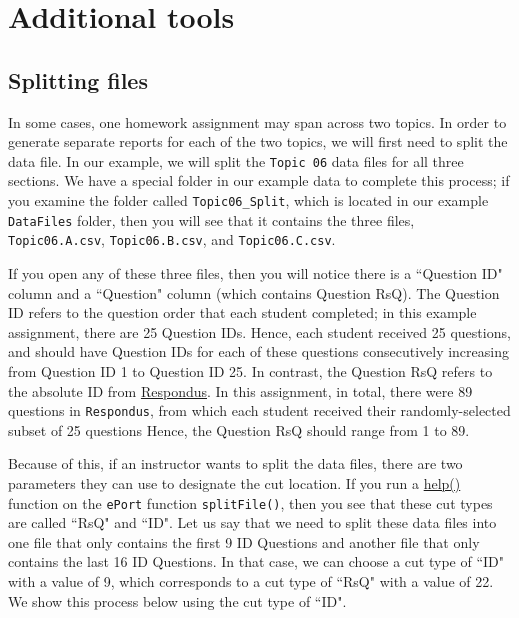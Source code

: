 \documentclass[11pt,a4paper,oldfontcommands,openany]{memoir}
\numberwithin{equation}{section} %
\begin{document}
\chapter{Additional tools}

\section{Splitting files}

In some cases, one homework assignment may span across two topics. In order to generate separate reports for each of the two topics, we will first need to split the data file. In our example, we will split the \texttt{Topic 06} data files for all three sections. We have a special folder in our example data to complete this process; if you examine the folder called \texttt{Topic06\_Split}, which is located in our example \texttt{DataFiles} folder, then you will see that it contains the three files, \texttt{Topic06.A.csv}, \texttt{Topic06.B.csv}, and \texttt{Topic06.C.csv}.

If you open any of these three files, then you will notice there is a ``Question ID" column and a ``Question" column (which contains Question RsQ). The Question ID refers to the question order that each student completed; in this example assignment, there are 25 Question IDs. Hence, each student received 25 questions, and should have Question IDs for each of these questions consecutively increasing from Question ID 1 to Question ID 25. In contrast, the Question RsQ refers to the absolute ID from \hyperref[sec:ResSection]{Respondus}. In this assignment, in total, there were 89 questions in \texttt{Respondus}, from which each student received their randomly-selected subset of 25 questions Hence, the Question RsQ should range from 1 to 89.

Because of this, if an instructor wants to split the data files, there are two parameters they can use to designate the cut location. If you run a \hyperref[sec:helpSection]{help()} function on the \texttt{ePort} function \texttt{splitFile()}, then you see that these cut types are called ``RsQ" and ``ID". Let us say that we need to split these data files into one file that only contains the first 9 ID Questions and another file that only contains the last 16 ID Questions. In that case, we can choose a cut type of ``ID" with a value of 9, which corresponds to a cut type of ``RsQ" with a value of 22. We show this process below using the cut type of ``ID". \\
\end{document}
